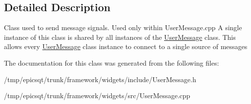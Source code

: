 \subsection{Detailed Description}
Class used to send message signals. Used only within UserMessage.cpp A single instance of this class is shared by all instances of the \hyperlink{classUserMessage}{UserMessage} class. This allows every \hyperlink{classUserMessage}{UserMessage} class instance to connect to a single source of messages 

The documentation for this class was generated from the following files:\begin{DoxyCompactItemize}
\item 
/tmp/epicsqt/trunk/framework/widgets/include/UserMessage.h\item 
/tmp/epicsqt/trunk/framework/widgets/src/UserMessage.cpp\end{DoxyCompactItemize}
